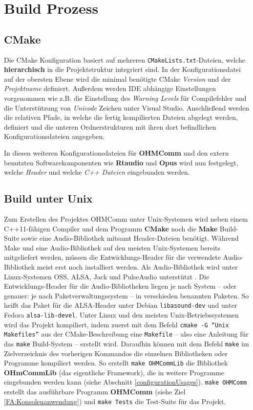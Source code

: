 \section{Build Prozess}
\subsection{CMake}
Die CMake Konfiguration basiert auf mehreren \texttt{CMakeLists.txt}-Dateien, welche \textbf{hierarchisch} in die Projektstruktur integriert sind. In der Konfigurationsdatei auf der obersten Ebene wird die minimal benötigte CMake \textit{Version} und der \textit{Projektname} definiert.
Außerdem werden IDE abhängige Einstellungen vorgenommen wie z.B. die Einstellung des \textit{Warning Levels} für Compilefehler und die Unterstützung von \textit{Unicode} Zeichen unter Visual Studio.
Anschließend werden die relativen Pfade, in welche die fertig kompilierten Dateien abgelegt werden, definiert und die unteren Ordnerstrukturen mit ihren dort befindlichen Konfigurationsdateien angegeben.

In diesen weiteren Konfigurationsdateien für \textbf{OHMComm} und den extern benutzten Softwarekomponenten wie \textbf{Rtaudio} und \textbf{Opus} wird nun festgelegt, welche \textit{Header} und welche \textit{C++ Dateien} eingebunden werden. 

\subsection{Build unter Unix}
Zum Erstellen des Projektes OHMComm unter Unix-Systemen wird neben einem C++11-fähigen Compiler und dem Programm \textbf{CMake} noch die \textbf{Make} Build-Suite sowie eine Audio-Bibliothek mitsamt Header-Dateien benötigt. Während Make und eine Audio-Bibliothek auf den meisten Unix-Systemen bereits mitgeliefert werden, müssen die Entwicklungs-Header für die verwendete Audio-Bibliothek meist erst noch installiert werden. Als Audio-Bibliothek wird unter Linux-Systemen OSS, ALSA, Jack und PulseAudio unterstützt \cite{RTAudioAPIs}. Die Entwicklungs-Header für die Audio-Bibliotheken liegen je nach System -- oder genauer: je nach Paketverwaltungssystem -- in verschieden benannten Paketen. So heißt das Paket für die ALSA-Header unter Debian \texttt{libasound-dev} und unter Fedora \texttt{alsa-lib-devel}.
Unter Linux und den meisten Unix-Betriebssystemen wird das Projekt kompiliert, indem zuerst mit dem Befehl \texttt{cmake -G ``Unix Makefiles''} aus der CMake-Beschreibung eine \texttt{Makefile} -- also eine Anleitung für das \texttt{make} Build-System -- erstellt wird. Daraufhin können mit dem Befehl \texttt{make} im Zielverzeichnis des vorherigen Kommandos die einzelnen Bibliotheken oder Programme kompiliert werden. So erstellt \texttt{make OHMCommLib} die Bibliothek \textbf{OHmCommLib} (das eigentliche Framework), die in weitere Programme eingebunden werden kann (siehe Abschnitt \ref{configurationUsages}). \texttt{make OHMComm} erstellt das ausführbare Programm \textbf{OHMComm} (siehe Ziel \ref{FA:Konsolenanwendung}) und \texttt{make Tests} die Test-Suite für das Projekt.

